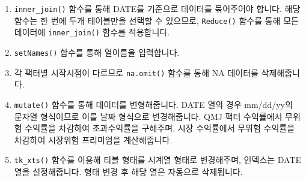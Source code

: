 \documentclass[12pt,]{book}
\newenvironment{Shaded}{\begin{snugshade}}{\end{snugshade}}
\newcommand{\ControlFlowTok}[1]{\textcolor[rgb]{0.13,0.29,0.53}{\textbf{#1}}}
\newcommand{\DataTypeTok}[1]{\textcolor[rgb]{0.13,0.29,0.53}{#1}}
\newcommand{\KeywordTok}[1]{\textcolor[rgb]{0.13,0.29,0.53}{\textbf{#1}}}
\newcommand{\NormalTok}[1]{#1}
\newcommand{\OperatorTok}[1]{\textcolor[rgb]{0.81,0.36,0.00}{\textbf{#1}}}
\newcommand{\StringTok}[1]{\textcolor[rgb]{0.31,0.60,0.02}{#1}}
\providecommand{\tightlist}{%
  \setlength{\itemsep}{0pt}\setlength{\parskip}{0pt}}
\begin{document}
\begin{Shaded}
\end{Shaded}

\begin{enumerate}
\def\labelenumi{\arabic{enumi}.}
\tightlist
\item
  \texttt{inner\_join()} 함수를 통해 DATE를 기준으로 데이터를 묶어주어야 합니다. 해당 함수는 한 번에 두개 테이블만을 선택할 수 있으므로, \texttt{Reduce()} 함수를 통해 모든 데이터에 \texttt{inner\_join()} 함수를 적용합니다.
\item
  \texttt{setNames()} 함수를 통해 열이름을 입력합니다.
\item
  각 팩터별 시작시점이 다르므로 \texttt{na.omit()} 함수를 통해 NA 데이터를 삭제해줍니다.
\item
  \texttt{mutate()} 함수를 통해 데이터를 변형해줍니다. DATE 열의 경우
  mm/dd/yy의 문자열 형식이므로 이를 날짜 형식으로 변경해줍니다. QMJ 팩터 수익률에서 무위험 수익률을 차감하여 초과수익률을 구해주며, 시장 수익률에서 무위험 수익률을 차감하여 시장위험 프리미엄을 계산해줍니다.
\item
  \texttt{tk\_xts()} 함수를 이용해 티블 형태를 시계열 형태로 변경해주며, 인덱스는 DATE 열을 설정해줍니다. 형태 변경 후 해당 열은 자동으로 삭제됩니다.
\end{enumerate}
\end{document}
